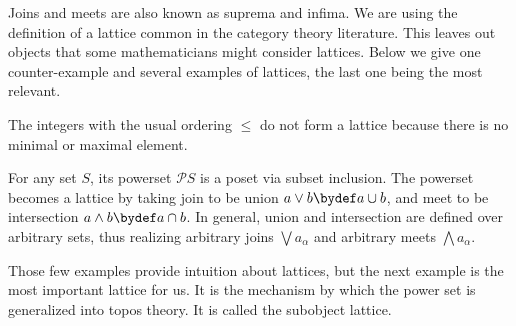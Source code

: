 Joins and meets are also known as suprema and infima. We are
using the definition of a lattice common in the category
theory literature. This leaves out objects that some
mathematicians might consider lattices. Below we give one
counter-example and several examples of lattices, the last
one being the most relevant.

\begin{example}
  The integers with the usual ordering $ \leq $ do not form
  a lattice because there is no minimal or maximal element.
\end{example}

\begin{example}
  For any set $ S $, its powerset $ \mathcal{P}S $ is a
  poset via subset inclusion. The powerset becomes a lattice
  by taking join to be union $ a \vee b \bydef a \cup b $,
  and meet to be intersection $ a \wedge b \bydef a \cap b
  $. In general, union and intersection are defined over
  arbitrary sets, thus realizing arbitrary joins
  $ \bigvee a_\alpha $ and arbitrary meets
  $ \bigwedge a_\alpha $. 
\end{example}

Those few examples provide intuition about lattices, but the
next example is the most important lattice for us. It is the
mechanism by which the power set is generalized into topos
theory. It is called the subobject lattice.

